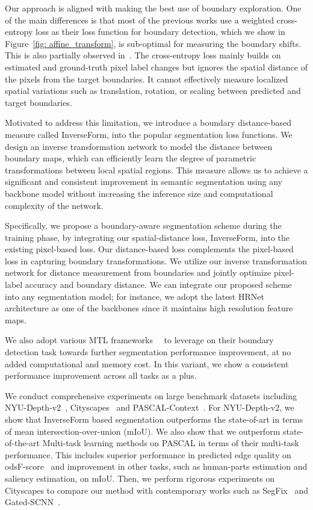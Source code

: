 \documentclass[final]{cvpr}
\begin{document}
Our approach is aligned with making the best use of boundary exploration. One of the main differences is that most of the previous works use a weighted cross-entropy loss as their loss function for boundary detection, which we show in Figure~\ref{fig: affine_transform}, is sub-optimal for measuring the boundary shifts. This is also partially observed in~\cite{kokkinos2016pushing}. The cross-entropy loss mainly builds on estimated and ground-truth pixel label changes but ignores the spatial distance of the pixels from the target boundaries. It cannot effectively measure localized spatial variations such as translation, rotation, or scaling between predicted and target boundaries. 

Motivated to address this limitation, we introduce a boundary distance-based measure called InverseForm, into the popular segmentation loss functions. We design an inverse transformation network to model the distance between boundary maps, which can efficiently learn the degree of parametric transformations between local spatial regions. This measure allows us to achieve a significant and consistent improvement in semantic segmentation using any backbone model without increasing the inference size and computational complexity of the network. 

Specifically, we propose a boundary-aware segmentation scheme during the training phase, by integrating our spatial-distance loss, InverseForm, into the existing pixel-based loss. Our distance-based loss complements the pixel-based loss in capturing boundary transformations. We utilize our inverse transformation network for distance measurement from boundaries and jointly optimize pixel-label accuracy and boundary distance. We can integrate our proposed scheme into any segmentation model; for instance, we adopt the latest HRNet~\cite{wang2020deep} architecture as one of the backbones since it maintains high resolution feature maps.

We also adopt various MTL frameworks~\cite{maninis2019attentive}~\cite{vandenhende2020mti} to leverage on their boundary detection task towards further segmentation performance improvement, at no added computational and memory cost. In this variant, we show a consistent performance improvement across all tasks as a plus.

We conduct comprehensive experiments on large benchmark datasets including NYU-Depth-v2~\cite{silberman2012indoor}, Cityscapes~\cite{cordts2016cityscapes} and PASCAL-Context~\cite{pascal2014}. For NYU-Depth-v2, we show that InverseForm based segmentation outperforms the state-of-art in terms of mean intersection-over-union (mIoU). We also show that we outperform state-of-the-art Multi-task learning methods on PASCAL in terms of their multi-task performance. This includes superior performance in predicted edge quality on odsF-score~\cite{odsf} and improvement in other tasks, such as human-parts estimation and saliency estimation, on mIoU. Then, we perform rigorous experiments on Cityscapes to compare our method with contemporary works such as SegFix~\cite{yuan2020segfix} and Gated-SCNN~\cite{takikawa2019gated}. 
\end{document}
